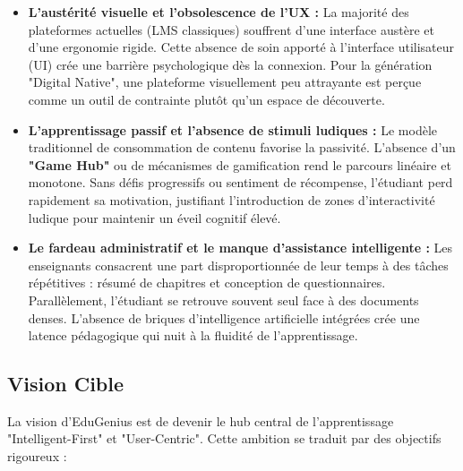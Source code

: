 \begin{itemize}
    \item \textbf{L’austérité visuelle et l’obsolescence de l’UX :} La majorité des plateformes actuelles (LMS classiques) souffrent d'une interface austère et d'une ergonomie rigide. Cette absence de soin apporté à l'interface utilisateur (UI) crée une barrière psychologique dès la connexion. Pour la génération "Digital Native", une plateforme visuellement peu attrayante est perçue comme un outil de contrainte plutôt qu'un espace de découverte.
    
    \item \textbf{L’apprentissage passif et l'absence de stimuli ludiques :} Le modèle traditionnel de consommation de contenu favorise la passivité. L'absence d'un \textbf{"Game Hub"} ou de mécanismes de gamification rend le parcours linéaire et monotone. Sans défis progressifs ou sentiment de récompense, l'étudiant perd rapidement sa motivation, justifiant l'introduction de zones d'interactivité ludique pour maintenir un éveil cognitif élevé.

    \item \textbf{Le fardeau administratif et le manque d'assistance intelligente :} Les enseignants consacrent une part disproportionnée de leur temps à des tâches répétitives : résumé de chapitres et conception de questionnaires. Parallèlement, l'étudiant se retrouve souvent seul face à des documents denses. L'absence de briques d'intelligence artificielle intégrées crée une latence pédagogique qui nuit à la fluidité de l'apprentissage.
\end{itemize}

\subsection{Vision Cible}
La vision d'EduGenius est de devenir le hub central de l'apprentissage "Intelligent-First" et "User-Centric". Cette ambition se traduit par des objectifs rigoureux :

